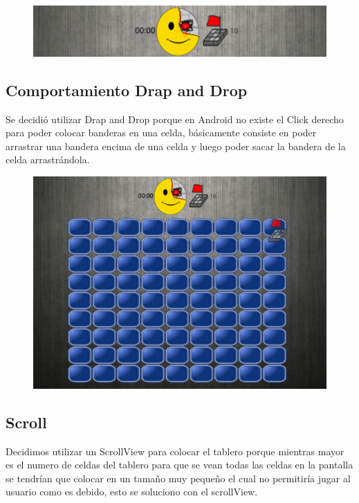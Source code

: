 \documentclass[11pt]{article} %
\begin{document}
\begin{figure}[H]
 \begin{center}
    \includegraphics{imagenes_Documentacion/barraMenu}
\end{center}
\caption {}
\label{Barra de Menu}
\end{figure}


\subsection{Comportamiento Drap and Drop}
Se decidió utilizar Drap and Drop porque en Android no existe el Click derecho para poder colocar banderas en una celda, básicamente consiste en poder arrastrar una bandera encima de una celda y luego poder sacar la bandera de la celda arrastrándola.

\begin{figure}[H]
 \begin{center}
    \includegraphics{imagenes_Documentacion/DrapandDrop}
\end{center}
\caption {}
\label{Drap and Drop}
\end{figure}


\subsection{Scroll}
Decidimos utilizar un ScrollView para colocar el tablero porque mientras mayor es el numero de celdas del tablero para que se vean todas las celdas en la pantalla se tendrían que colocar en un tamaño muy pequeño el cual no permitiría jugar al usuario como es debido, esto se soluciono con el scrollView.\\
\end{document}
